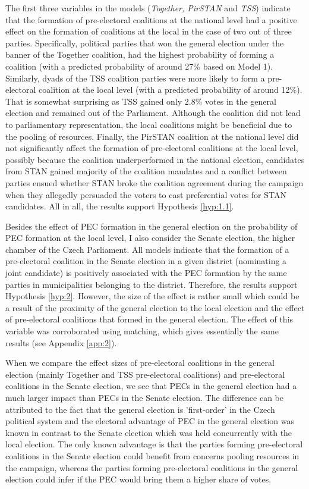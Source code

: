 \documentclass[]{interact}
\theoremstyle{plain}%
\theoremstyle{definition}
\theoremstyle{remark}
\begin{document}
The first three variables in the models (\emph{Together, PirSTAN} and \emph{TSS}) indicate that the formation of pre-electoral coalitions at the national level had a positive effect on the formation of coalitions at the local in the case of two out of three parties. Specifically, political parties that won the general election under the banner of the Together coalition, had the highest probability of forming a coalition (with a predicted probability of around 27\% based on Model 1). Similarly, dyads of the TSS coalition parties were more likely to form a pre-electoral coalition at the local level (with a predicted probability of around 12\%). That is somewhat surprising as TSS gained only 2.8\% votes in the general election and remained out of the Parliament. Although the coalition did not lead to parliamentary representation, the local coalitions might be beneficial due to the pooling of resources. Finally, the PirSTAN coalition at the national level did not significantly affect the formation of pre-electoral coalitions at the local level, possibly because the coalition underperformed in the national election, candidates from STAN gained majority of the coalition mandates and a conflict between parties ensued whether STAN broke the coalition agreement during the campaign when they allegedly persuaded the voters to cast preferential votes for STAN candidates. All in all, the results support Hypothesis \ref{hyp:1.1}.

Besides the effect of PEC formation in the general election on the probability of PEC formation at the local level, I also consider the Senate election, the higher chamber of the Czech Parliament. All models indicate that the formation of a pre-electoral coalition in the Senate election in a given district (nominating a joint candidate) is positively associated with the PEC formation by the same parties in municipalities belonging to the district. Therefore, the results support Hypothesis \ref{hyp:2}. However, the size of the effect is rather small which could be a result of the proximity of the general election to the local election and the effect of pre-electoral coalitions that formed in the general election.
The effect of this variable was corroborated using matching, which gives essentially the same results (see Appendix \ref{app:2}).

When we compare the effect sizes of pre-electoral coalitions in the general election (mainly Together and TSS pre-electoral coalitions) and pre-electoral coalitions in the Senate election, we see that PECs in the general election had a much larger impact than PECs in the Senate election. The difference can be attributed to the fact that the general election is 'first-order' in the Czech political system and the electoral advantage of PEC in the general election was known in contrast to the Senate election which was held concurrently with the local election. The only known advantage is that the parties forming pre-electoral coalitions in the Senate election could benefit from concerns pooling resources in the campaign, whereas the parties forming pre-electoral coalitions in the general election could infer if the PEC would bring them a higher share of votes.
\end{document}
